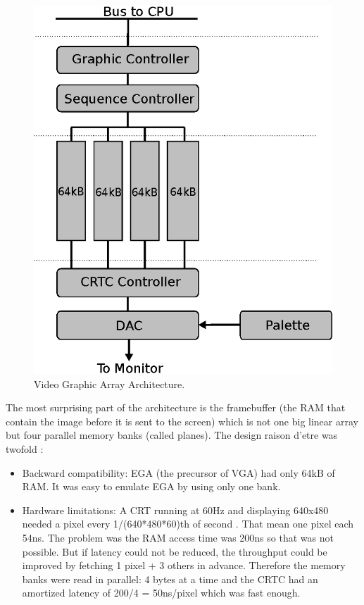 \documentclass[book.tex]{subfiles}
\begin{document}
\begin{figure}[H]
\centering
\includegraphics[scale=1.2]{imgs/vga.eps}
\caption{Video Graphic Array Architecture.}
\label{fig:vga_arch}
\end{figure}



The most surprising part of the architecture is the framebuffer (the RAM that contain the image before it is sent to the screen) which is not one big linear array but four parallel memory banks (called planes). The design raison d'etre was twofold :



\begin{itemize}



\item Backward compatibility: EGA (the precursor of VGA) had only 64kB of RAM. It was easy to emulate EGA by using only one bank.
\item Hardware limitations: A CRT running at 60Hz and displaying 640x480 needed a pixel every 1/(640*480*60)th of second . That mean one pixel each 54ns. The problem was the RAM access time was 200ns so that was not possible. But if latency could not be reduced, the throughput could be improved by fetching 1 pixel + 3 others in advance. Therefore the memory banks were read in parallel: 4 bytes at a time and the CRTC had an amortized latency of 200/4 = 50ns/pixel which was fast enough.
\end{itemize}
\end{document}
